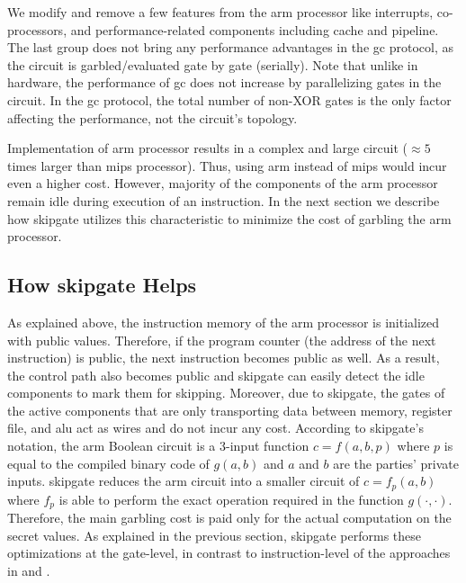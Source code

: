We modify and remove a few features from the \gls{arm} processor like interrupts, co-processors, and performance-related components including cache and pipeline.
The last group does not bring any performance advantages in the \acrshort{gc} protocol, as the circuit is garbled/evaluated gate by gate (serially).
Note that unlike in hardware, the performance of \acrshort{gc} does not increase by parallelizing gates in the circuit.
In the \acrshort{gc} protocol, the total number of non-XOR gates is the only factor affecting the performance, not the circuit's topology.

Implementation of \gls{arm} processor results in a complex and large circuit ($\approx 5$ times larger than \gls{mips} processor).
Thus, using \gls{arm} instead of \gls{mips} would incur even a higher cost.
However, majority of the components of the \gls{arm} processor remain idle during  execution of an instruction.
In the next section we describe how \gls{skipgate} utilizes this characteristic to minimize the cost of garbling the \gls{arm} processor.

\subsection{How {\gls{skipgate}} Helps}
As explained above, the instruction memory of the \gls{arm} processor is initialized with public values.
Therefore, if the program counter (the address of the next instruction) is public, the next instruction becomes public as well.
As a result, the control path also becomes public and \gls{skipgate} can easily detect the idle components to mark them for skipping.
Moreover, due to \gls{skipgate}, the gates of the active components that are only transporting data between memory, register file, and \acrshort{alu} act as wires and do not incur any cost.
According to \gls{skipgate}'s notation, the \gls{arm} Boolean circuit is a 3-input function $c = f(a,b,p)$ where $p$ is equal to the compiled binary code of $g(a,b)$ and $a$ and $b$ are the parties' private inputs.
\gls{skipgate} reduces the \gls{arm} circuit into a smaller circuit of $c = f_p(a,b)$ where $f_p$ is able to perform the exact operation required in the function $g(\cdot,\cdot)$.
Therefore, the main garbling cost is paid only for the actual computation on the secret values.
As explained in the previous section, \gls{skipgate} performs these optimizations at the gate-level, in contrast to instruction-level of the approaches in  and \cite{wang2016secure}.

